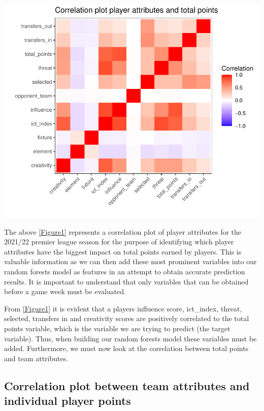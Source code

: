 \documentclass[11pt,preprint, authoryear]{elsarticle}
\let\origfigure\figure
\let\endorigfigure\endfigure
\renewenvironment{figure}[1][2] {
    \expandafter\origfigure\expandafter[H]
} {
    \endorigfigure
}
\numberwithin{equation}{section}
\numberwithin{figure}{section}
\numberwithin{table}{section}
\begin{document}
\begin{figure}[H]

{\centering \includegraphics{Fantasy_premier_league_team_prediction_files/figure-latex/unnamed-chunk-2-1} 

}

\caption{Player attributes correlation plot\label{Figure1}}\label{fig:unnamed-chunk-2}
\end{figure}

The above \ref{Figure1} represents a correlation plot of player
attributes for the 2021/22 premier league season for the purpose of
identifying which player attributes have the biggest impact on total
points earned by players. This is valuable information as we can then
add these most prominent variables into our random forests model as
features in an attempt to obtain accurate prediction results. It is
important to understand that only variables that can be obtained before
a game week must be evaluated.

From \ref{Figure1} it is evident that a players influence score,
ict\_index, threat, selected, transfers in and creativity scores are
positively correlated to the total points variable, which is the
variable we are trying to predict (the target variable). Thus, when
building our random forests model these variables must be added.
Furthermore, we must now look at the correlation between total points
and team attributes.

\hypertarget{correlation-plot-between-team-attributes-and-individual-player-points}{%
\subsection{Correlation plot between team attributes and individual
player
points}\label{correlation-plot-between-team-attributes-and-individual-player-points}}
\end{document}
